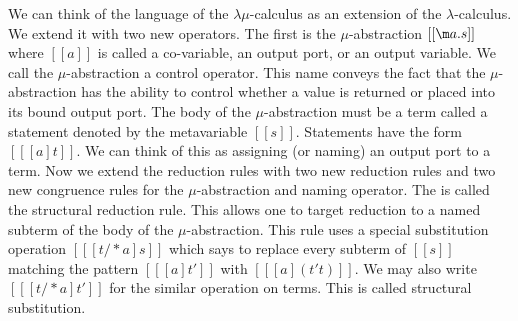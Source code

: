 We can think of the language of the $\lambda\mu$-calculus as an
extension of the $\lambda$-calculus.  We extend it with two new
operators.  The first is the $\mu$-abstraction $[[\m a.s]]$ where
$[[a]]$ is called a co-variable, an output port, or an output
variable.  We call the $\mu$-abstraction a control operator.  This
name conveys the fact that the $\mu$-abstraction has the ability to
control whether a value is returned or placed into its bound output
port.  The body of the $\mu$-abstraction must be a term called a
statement denoted by the metavariable $[[s]]$.  Statements have the form $[[
    [a]t]]$.  We can think of this as assigning (or naming) an output
port to a term.  Now we extend the reduction rules with two new
reduction rules and two new congruence rules for the $\mu$-abstraction
and naming operator.  The  is called the
structural reduction rule.  This allows one to target reduction to a
named subterm of the body of the $\mu$-abstraction.  This rule uses
a special substitution operation $[[ [t /* a]s]]$ which says to 
replace every subterm of $[[s]]$ matching the pattern $[[ [a]t']]$
with $[[ [a](t' t)]]$.  We may also write $[[ [t /* a]t']]$ for the
similar operation on terms. This is called structural substitution.

